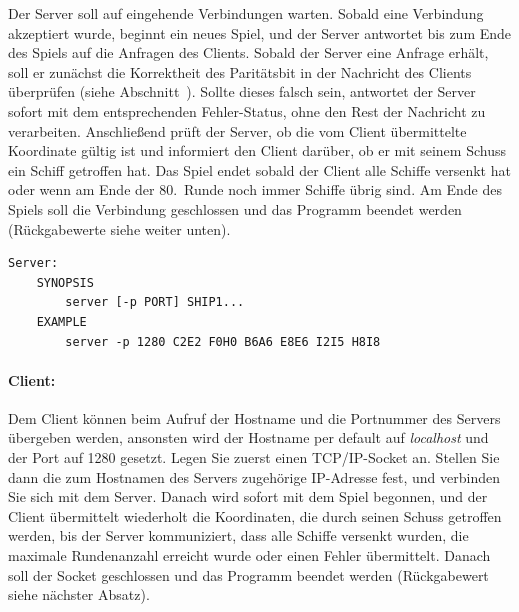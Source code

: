 Der Server soll auf eingehende Verbindungen warten. Sobald eine Verbindung
akzeptiert wurde, beginnt ein neues Spiel, und der Server antwortet bis zum
Ende des Spiels auf die Anfragen des Clients.
Sobald der Server eine Anfrage erhält, soll er zunächst die Korrektheit des Paritätsbit in der Nachricht des Clients
überprüfen (siehe Abschnitt~).
Sollte dieses falsch sein, antwortet der Server sofort mit dem entsprechenden Fehler-Status,
ohne den Rest der Nachricht zu verarbeiten.
Anschließend prüft der Server, ob die vom Client übermittelte Koordinate gültig ist
und informiert den Client darüber, ob er mit seinem Schuss ein Schiff getroffen hat.
Das Spiel endet sobald der Client alle Schiffe versenkt hat
oder wenn am Ende der 80.\ Runde noch immer Schiffe übrig sind.
Am Ende des Spiels soll die Verbindung geschlossen und das Programm beendet werden
(Rückgabewerte siehe weiter unten).



\vspace{-10pt}
\begin{verbatim}
Server:
    SYNOPSIS
        server [-p PORT] SHIP1...
    EXAMPLE
        server -p 1280 C2E2 F0H0 B6A6 E8E6 I2I5 H8I8
\end{verbatim}

\paragraph{Client:}

Dem Client können beim Aufruf der Hostname und die Portnummer des Servers
übergeben werden, ansonsten wird der Hostname per default auf \emph{localhost}
und der Port auf 1280 gesetzt. Legen Sie zuerst einen
TCP/IP-Socket an. Stellen Sie dann die zum Hostnamen des Servers zugehörige
IP-Adresse fest, und verbinden Sie sich mit dem Server. Danach wird sofort mit
dem Spiel begonnen, und der Client übermittelt wiederholt die Koordinaten,
die durch seinen Schuss getroffen werden, bis der Server kommuniziert,
dass alle Schiffe versenkt wurden, die maximale Rundenanzahl erreicht wurde
oder einen Fehler übermittelt.
Danach soll der Socket geschlossen und das
Programm beendet werden (Rückgabewert siehe nächster Absatz).

